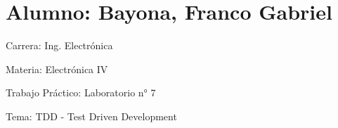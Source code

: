 \chapter{Alumno\+: Bayona, Franco Gabriel}
\hypertarget{md__r_e_a_d_m_e}{}\label{md__r_e_a_d_m_e}
\label{md__r_e_a_d_m_e_autotoc_md0}%
%



\begin{DoxyItemize}
\item Carrera\+: Ing. Electrónica
\item Materia\+: Electrónica IV
\item Trabajo Práctico\+: Laboratorio n° 7
\item Tema\+: TDD -\/ Test Driven Development 
\end{DoxyItemize}